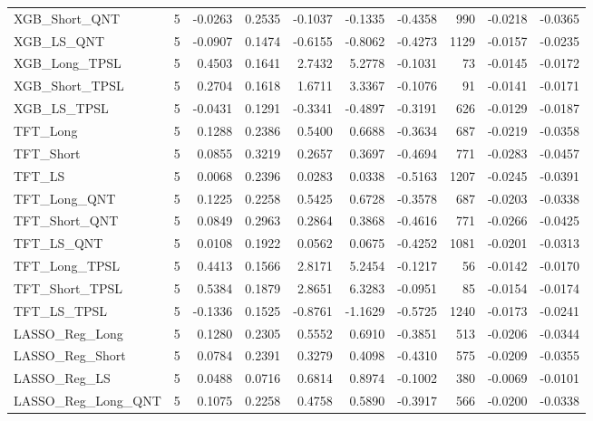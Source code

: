 \begin{tabular}{llrrrrrrrr}
\cline{1-10}
XGB\_Short\_QNT & 5 & -0.0263 & 0.2535 & -0.1037 & -0.1335 & -0.4358 & 990 & -0.0218 & -0.0365 \\
\cline{1-10}
XGB\_LS\_QNT & 5 & -0.0907 & 0.1474 & -0.6155 & -0.8062 & -0.4273 & 1129 & -0.0157 & -0.0235 \\
\cline{1-10}
XGB\_Long\_TPSL & 5 & 0.4503 & 0.1641 & 2.7432 & 5.2778 & -0.1031 & 73 & -0.0145 & -0.0172 \\
\cline{1-10}
XGB\_Short\_TPSL & 5 & 0.2704 & 0.1618 & 1.6711 & 3.3367 & -0.1076 & 91 & -0.0141 & -0.0171 \\
\cline{1-10}
XGB\_LS\_TPSL & 5 & -0.0431 & 0.1291 & -0.3341 & -0.4897 & -0.3191 & 626 & -0.0129 & -0.0187 \\
\cline{1-10}
TFT\_Long & 5 & 0.1288 & 0.2386 & 0.5400 & 0.6688 & -0.3634 & 687 & -0.0219 & -0.0358 \\
\cline{1-10}
TFT\_Short & 5 & 0.0855 & 0.3219 & 0.2657 & 0.3697 & -0.4694 & 771 & -0.0283 & -0.0457 \\
\cline{1-10}
TFT\_LS & 5 & 0.0068 & 0.2396 & 0.0283 & 0.0338 & -0.5163 & 1207 & -0.0245 & -0.0391 \\
\cline{1-10}
TFT\_Long\_QNT & 5 & 0.1225 & 0.2258 & 0.5425 & 0.6728 & -0.3578 & 687 & -0.0203 & -0.0338 \\
\cline{1-10}
TFT\_Short\_QNT & 5 & 0.0849 & 0.2963 & 0.2864 & 0.3868 & -0.4616 & 771 & -0.0266 & -0.0425 \\
\cline{1-10}
TFT\_LS\_QNT & 5 & 0.0108 & 0.1922 & 0.0562 & 0.0675 & -0.4252 & 1081 & -0.0201 & -0.0313 \\
\cline{1-10}
TFT\_Long\_TPSL & 5 & 0.4413 & 0.1566 & 2.8171 & 5.2454 & -0.1217 & 56 & -0.0142 & -0.0170 \\
\cline{1-10}
TFT\_Short\_TPSL & 5 & 0.5384 & 0.1879 & 2.8651 & 6.3283 & -0.0951 & 85 & -0.0154 & -0.0174 \\
\cline{1-10}
TFT\_LS\_TPSL & 5 & -0.1336 & 0.1525 & -0.8761 & -1.1629 & -0.5725 & 1240 & -0.0173 & -0.0241 \\
\cline{1-10}
LASSO\_Reg\_Long & 5 & 0.1280 & 0.2305 & 0.5552 & 0.6910 & -0.3851 & 513 & -0.0206 & -0.0344 \\
\cline{1-10}
LASSO\_Reg\_Short & 5 & 0.0784 & 0.2391 & 0.3279 & 0.4098 & -0.4310 & 575 & -0.0209 & -0.0355 \\
\cline{1-10}
LASSO\_Reg\_LS & 5 & 0.0488 & 0.0716 & 0.6814 & 0.8974 & -0.1002 & 380 & -0.0069 & -0.0101 \\
\cline{1-10}
LASSO\_Reg\_Long\_QNT & 5 & 0.1075 & 0.2258 & 0.4758 & 0.5890 & -0.3917 & 566 & -0.0200 & -0.0338 \\

\end{tabular}
